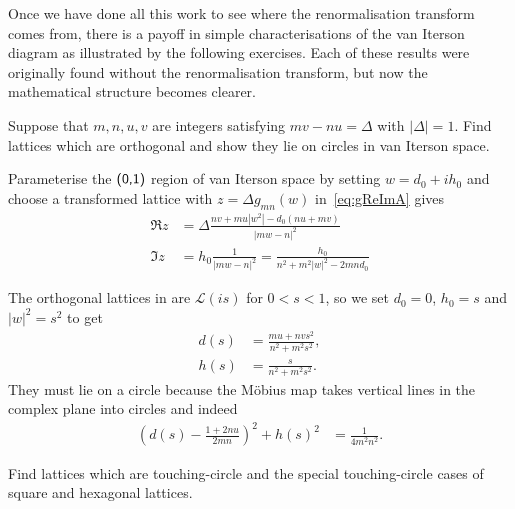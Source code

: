Once we have done all this work to see where the renormalisation transform comes from, there is a payoff in simple characterisations of the van Iterson diagram  as illustrated by the following exercises. Each of these results were originally found without the renormalisation transform, but now the mathematical structure becomes clearer. 


\begin{jExercise}
	Suppose that $m ,n ,u, v$ are integers satisfying  $m v - n u =\Delta $ with $|\Delta|=1$.  Find   lattices which are  orthogonal and show they lie on circles in van Iterson space.
\end{jExercise}
\begin{jAnswer}
	Parameterise the  $\textsf{(0,1)}$ region of van Iterson space by setting $w=d_0+ih_0$ and choose a transformed lattice with $z=\Delta g_{mn}(w)$ in~\eqref{eq:gReImA} gives
	\begin{align}
		\Re z &= 
		\Delta \frac{n v + m u| w^2|	- d_0( n u + m v)}{|m w-n|^2} 
		\label{eq:rez}
		\\
		\Im z &=	h_0 
		\frac{ 1}{|m w-n|^2} =  
		\frac{ h_0}{n^2 + m^2 |w|^2 - 2 m n d_0}
		\label{eq:gReIBm}
	\end{align}
	
	The orthogonal lattices in  are $\mathcal{L}(is)$ for $0<s<1$, so we set $d_0=0$, $h_0=s$ and $|w|^2=s^2$ to get 
	\begin{align}
		d(s) &= \frac{ m u +  n v s^2  }{n^2 +m^2 s^2 },
		\\
		h(s)  &= \frac{s}{n^2 +m^2 s^2  }.
	\end{align}
	They must lie on a circle because the M\"obius map takes vertical lines in the complex plane into circles and indeed
	\begin{align}
		\left( d(s)- \frac{1+2nu}{2mn}\right)^2 + h(s)^2 &= \frac{1}{4 m^2 n^2}.
	\end{align}
	
\end{jAnswer}

\begin{jExercise}
	Find   lattices which are touching-circle and the special touching-circle cases of square and hexagonal lattices. 
	\label{ex:orthogonal}
\end{jExercise}

